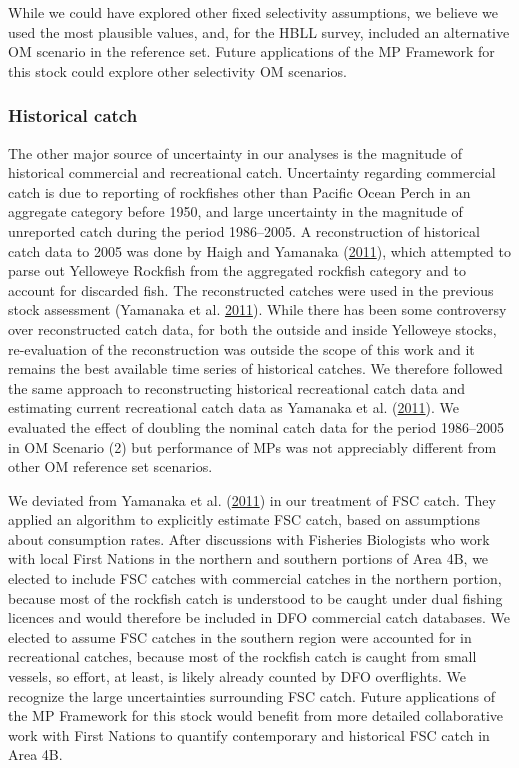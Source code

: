 \documentclass[11pt]{book}
\begin{document}
While we could have explored other fixed selectivity assumptions, we believe we used the most plausible values, and, for the HBLL survey, included an alternative OM scenario in the reference set. Future applications of the MP Framework for this stock could explore other selectivity OM scenarios.

\hypertarget{sec:discussion-uncertainties-catch}{%
\subsubsection{Historical catch}\label{sec:discussion-uncertainties-catch}}

The other major source of uncertainty in our analyses is the magnitude of historical commercial and recreational catch. Uncertainty regarding commercial catch is due to reporting of rockfishes other than Pacific Ocean Perch in an aggregate category before 1950, and large uncertainty in the magnitude of unreported catch during the period 1986--2005. A reconstruction of historical catch data to 2005 was done by Haigh and Yamanaka (\protect\hyperlink{ref-haigh2011}{2011}), which attempted to parse out Yelloweye Rockfish from the aggregated rockfish category and to account for discarded fish. The reconstructed catches were used in the previous stock assessment (Yamanaka et al. \protect\hyperlink{ref-yamanaka2011}{2011}). While there has been some controversy over reconstructed catch data, for both the outside and inside Yelloweye stocks, re-evaluation of the reconstruction was outside the scope of this work and it remains the best available time series of historical catches. We therefore followed the same approach to reconstructing historical recreational catch data and estimating current recreational catch data as Yamanaka et al. (\protect\hyperlink{ref-yamanaka2011}{2011}). We evaluated the effect of doubling the nominal catch data for the period 1986--2005 in OM Scenario (2) but performance of MPs was not appreciably different from other OM reference set scenarios.

We deviated from Yamanaka et al. (\protect\hyperlink{ref-yamanaka2011}{2011}) in our treatment of FSC catch. They applied an algorithm to explicitly estimate FSC catch, based on assumptions about consumption rates. After discussions with Fisheries Biologists who work with local First Nations in the northern and southern portions of Area 4B, we elected to include FSC catches with commercial catches in the northern portion, because most of the rockfish catch is understood to be caught under dual fishing licences and would therefore be included in DFO commercial catch databases. We elected to assume FSC catches in the southern region were accounted for in recreational catches, because most of the rockfish catch is caught from small vessels, so effort, at least, is likely already counted by DFO overflights. We recognize the large uncertainties surrounding FSC catch. Future applications of the MP Framework for this stock would benefit from more detailed collaborative work with First Nations to quantify contemporary and historical FSC catch in Area 4B.
\end{document}
